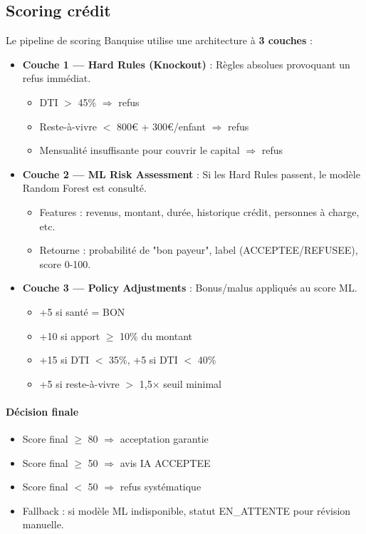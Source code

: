 \documentclass[12pt,a4paper]{report}
\begin{document}
\subsection{Scoring crédit}
Le pipeline de scoring Banquise utilise une architecture à \textbf{3 couches} :
\begin{itemize}[leftmargin=1.5cm]
    \item \textbf{Couche 1 — Hard Rules (Knockout)} : Règles absolues provoquant un refus immédiat.
    \begin{itemize}
        \item DTI $>$ 45\% $\Rightarrow$ refus
        \item Reste-à-vivre $<$ 800€ + 300€/enfant $\Rightarrow$ refus
        \item Mensualité insuffisante pour couvrir le capital $\Rightarrow$ refus
    \end{itemize}
    \item \textbf{Couche 2 — ML Risk Assessment} : Si les Hard Rules passent, le modèle Random Forest est consulté.
    \begin{itemize}
        \item Features : revenus, montant, durée, historique crédit, personnes à charge, etc.
        \item Retourne : probabilité de "bon payeur", label (ACCEPTEE/REFUSEE), score 0-100.
    \end{itemize}
    \item \textbf{Couche 3 — Policy Adjustments} : Bonus/malus appliqués au score ML.
    \begin{itemize}
        \item +5 si santé = BON
        \item +10 si apport $\geq$ 10\% du montant
        \item +15 si DTI $<$ 35\%, +5 si DTI $<$ 40\%
        \item +5 si reste-à-vivre $>$ 1,5× seuil minimal
    \end{itemize}
\end{itemize}

\paragraph{Décision finale}
\begin{itemize}[leftmargin=1.5cm]
    \item Score final $\geq$ 80 $\Rightarrow$ acceptation garantie
    \item Score final $\geq$ 50 $\Rightarrow$ avis IA \og ACCEPTEE \fg{}
    \item Score final $<$ 50 $\Rightarrow$ refus systématique
    \item Fallback : si modèle ML indisponible, statut \og EN\_ATTENTE \fg{} pour révision manuelle.
\end{itemize}
\end{document}
